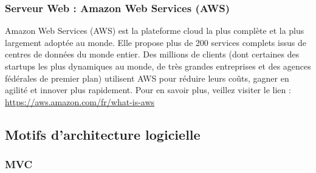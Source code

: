 \subsubsection{Serveur Web : Amazon Web Services (AWS)}
Amazon Web Services (AWS) est la plateforme cloud la plus complète et la plus largement adoptée au monde. Elle propose plus de 200 services complets issus de centres de données du monde entier. Des millions de clients (dont certaines des startups les plus dynamiques au monde, de très grandes entreprises et des agences fédérales de premier plan) utilisent AWS pour réduire leurs coûts, gagner en agilité et innover plus rapidement.
\newline Pour en savoir plus, veillez
visiter le lien : \href{https://aws.amazon.com/fr/what-is-aws/#:~:text=Amazon%20Web%20Services%20(AWS)%20est,de%20donn%C3%A9es%20du%20monde%20entier.}{https://aws.amazon.com/fr/what-is-aws}


\subsection{Motifs d’architecture logicielle}
\subsubsection{MVC}

